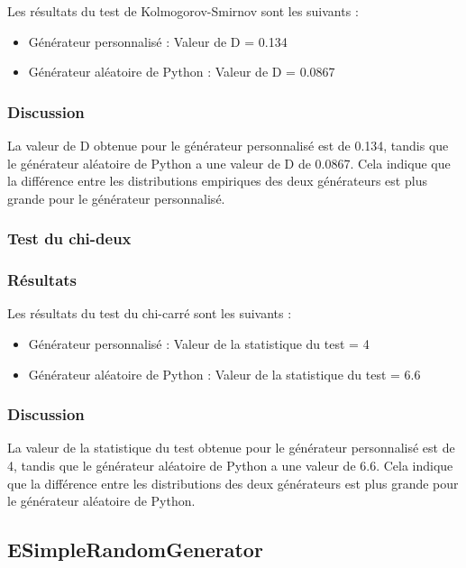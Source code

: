 \documentclass{article}
\begin{document}
Les résultats du test de Kolmogorov-Smirnov sont les suivants :

\begin{itemize}
  \item Générateur personnalisé : Valeur de D = 0.134
  \item Générateur aléatoire de Python : Valeur de D = 0.0867
\end{itemize}

\subsubsection*{Discussion}

La valeur de D obtenue pour le générateur personnalisé est de 0.134, tandis que le générateur aléatoire de Python a une valeur de D de 0.0867. Cela indique que la différence entre les distributions empiriques des deux générateurs est plus grande pour le générateur personnalisé.

\subsubsection*{Test du chi-deux}

\subsubsection*{Résultats}

Les résultats du test du chi-carré sont les suivants :

\begin{itemize}
  \item Générateur personnalisé : Valeur de la statistique du test = 4
  \item Générateur aléatoire de Python : Valeur de la statistique du test = 6.6
\end{itemize}

\subsubsection*{Discussion}

La valeur de la statistique du test obtenue pour le générateur personnalisé est de 4, tandis que le générateur aléatoire de Python a une valeur de 6.6. Cela indique que la différence entre les distributions des deux générateurs est plus grande pour le générateur aléatoire de Python.

\subsection{ESimpleRandomGenerator}
\end{document}
